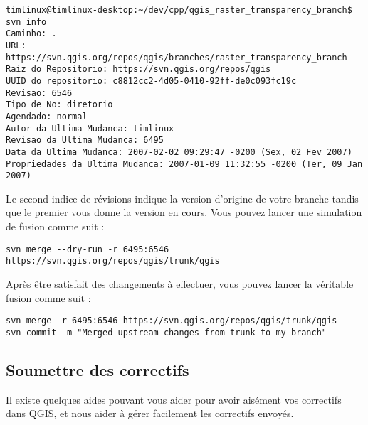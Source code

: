 \begin{verbatim}
timlinux@timlinux-desktop:~/dev/cpp/qgis_raster_transparency_branch$ svn info
Caminho: .
URL: https://svn.qgis.org/repos/qgis/branches/raster_transparency_branch
Raiz do Repositorio: https://svn.qgis.org/repos/qgis
UUID do repositorio: c8812cc2-4d05-0410-92ff-de0c093fc19c
Revisao: 6546
Tipo de No: diretorio
Agendado: normal
Autor da Ultima Mudanca: timlinux
Revisao da Ultima Mudanca: 6495
Data da Ultima Mudanca: 2007-02-02 09:29:47 -0200 (Sex, 02 Fev 2007)
Propriedades da Ultima Mudanca: 2007-01-09 11:32:55 -0200 (Ter, 09 Jan 2007)
\end{verbatim}

Le second indice de r\'evisions indique la version d'origine de votre branche tandis que le premier vous donne la version en cours. Vous pouvez lancer une simulation de fusion comme suit :

\begin{verbatim}
svn merge --dry-run -r 6495:6546 https://svn.qgis.org/repos/qgis/trunk/qgis
\end{verbatim}

Apr\`es \^etre satisfait des changements \`a effectuer, vous pouvez lancer la v\'eritable fusion comme suit : 
\begin{verbatim}
svn merge -r 6495:6546 https://svn.qgis.org/repos/qgis/trunk/qgis
svn commit -m "Merged upstream changes from trunk to my branch"
\end{verbatim}

\subsection{Soumettre des correctifs}
Il existe quelques aides pouvant vous aider pour avoir ais\'ement vos correctifs dans QGIS, et nous aider \`a g\'erer facilement les correctifs envoy\'es.

